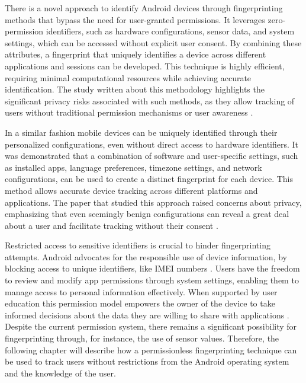 \documentclass[11pt,
  oneside,openany,    %
]{scrreprt}
\begin{document}
There is a novel approach to identify Android devices through fingerprinting methods that bypass the need for user-granted permissions.
It leverages zero-permission identifiers, such as hardware configurations, sensor data, and system settings, which can be accessed without explicit user consent.
By combining these attributes, a fingerprint that uniquely identifies a device across different applications and sessions can be developed.
This technique is highly efficient, requiring minimal computational resources while achieving accurate identification.
The study written about this methodology highlights the significant privacy risks associated with such methods, as they allow tracking of users without traditional permission mechanisms or user awareness \cite{DBLP:journals/access/WuWWLY16}.

In a similar fashion mobile devices can be uniquely identified through their personalized configurations, even without direct access to hardware identifiers.
It was demonstrated that a combination of software and user-specific settings, such as installed apps, language preferences, timezone settings, and network configurations, can be used to create a distinct fingerprint for each device.
This method allows accurate device tracking across different platforms and applications.
The paper that studied this approach raised concerns about privacy, emphasizing that even seemingly benign configurations can reveal a great deal about a user and facilitate tracking without their consent \cite{DBLP:journals/popets/KurtzGBRF16}.

Restricted access to sensitive identifiers is crucial to hinder fingerprinting attempts. 
Android advocates for the responsible use of device information, by blocking access to unique identifiers, like IMEI numbers \cite{android_privacy_10, DBLP:conf/ndss/MengZXZZBLTD23}.
Users have the freedom to review and modify app permissions through system settings, enabling them to manage access to personal information effectively. 
When supported by user education this permission model empowers the owner of the device to take informed decisions about the data they are willing to share with applications \cite{DBLP:conf/icta/NegashS15}.
Despite the current permission system, there remains a significant possibility for fingerprinting through, for instance, the use of sensor values.
Therefore, the following chapter will describe how a permissionless fingerprinting technique can be used to track users without restrictions from the Android operating system and the knowledge of the user.
\end{document}
